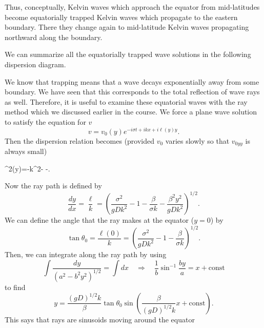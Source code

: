 
Thus, conceptually, Kelvin waves which approach the equator from mid-latitudes become
equatorially trapped Kelvin waves which propagate to the eastern boundary. There they
change again to mid-latitude Kelvin waves propagating northward along the boundary.

We can summarize all the equatorially trapped wave solutions in the following
dispersion diagram.


\sourcepagebreak

We know that trapping means that a wave decays exponentially away from some boundary.
We have seen that this corresponds to the total reflection of wave rays as well.
Therefore, it is useful to examine these equatorial waves with the ray method which we
discussed earlier in the course. We force a plane wave solution to satisfy the equation
for $v$
\[
	v=v_0(y)e^{-i\sigma t+ikx+i\ell(y)y}.
\]
Then the dispersion relation becomes (provided $v_0$ varies slowly so that $v_{0yy}$ is
always small)
\begin{waveequation}
	\ell^2(y)=-k^2-
	-.
\end{waveequation}
Now the ray path is defined by
\[
	\frac{dy}{dx}=\frac{\ell}{k}
	=\left(
	\frac{\sigma^2}{gDk^2}-1-\frac{\beta}{\sigma k}
	-\frac{\beta^2y^2}{gDk^2}
	\right)^{1/2}.
\]
We can define the angle that the ray makes at the equator ($y=0$) by
\[
	\tan\theta_0=\frac{\ell(0)}{k}
	=\left(
	\frac{\sigma^2}{gDk^2}-1-\frac{\beta}{\sigma k}
	\right)^{1/2}.
\]
Then, we can integrate along the ray path by using
\[
	\int\frac{dy}{(a^2-b^2y^2)^{1/2}}
	=\int dx
	\quad\Rightarrow\quad
	\frac{1}{b}\sin^{-1}\frac{by}{a}=x+\mathrm{const}
\]
to find
\[
	y=\frac{(gD)^{1/2}k}{\beta}\tan\theta_0
	\sin\left(
	\frac{\beta}{(gD)^{1/2}k}x+\mathrm{const}
	\right).
\]
This says that rays are sinusoids moving around the equator

\sourcepagebreak

